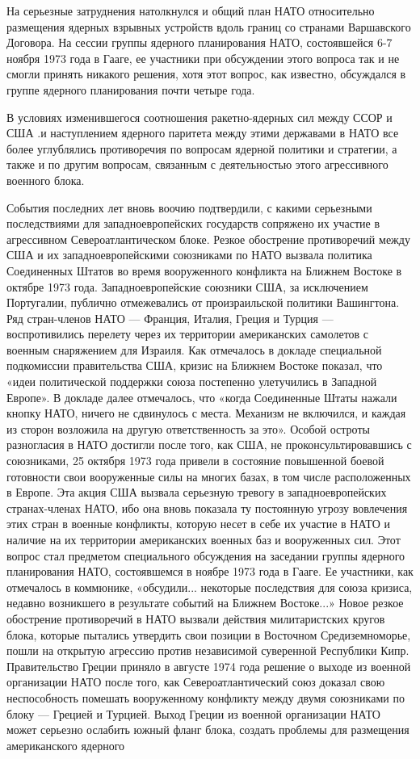 \documentclass[12pt, a4paper, openany]{book}
\begin{document}
	На серьезные затруднения натолкнулся и общий план НАТО относительно размещения ядерных взрывных устройств вдоль границ со странами Варшавского Договора. На сессии группы ядерного планирования НАТО, состоявшейся 6-7 ноября 1973 года в Гааге, ее участники при обсуждении этого вопроса так и не смогли принять никакого решения, хотя этот вопрос, как известно, обсуждался в группе ядерного планирования почти четыре года.
	
	В условиях изменившегося соотношения ракетно-ядерных сил между ССОР и США .и наступлением ядерного паритета между этими державами в НАТО все более углублялись противоречия по вопросам ядерной политики и стратегии, а также и по другим вопросам, связанным с деятельностью этого агрессивного военного блока.
	
	События последних лет вновь воочию подтвердили, с какими серьезными последствиями для западноевропейских государств сопряжено их участие в агрессивном Североатлантическом блоке. Резкое обострение противоречий между США и их западноевропейскими союзниками по НАТО вызвала политика Соединенных Штатов во время вооруженного конфликта на Ближнем Востоке в октябре 1973 года. Западноевропейские союзники США, за исключением Португалии, публично отмежевались от произраильской политики Вашингтона. Ряд стран-членов НАТО — Франция, Италия, Греция и Турция — воспротивились перелету через их территории американских самолетов с военным снаряжением для Израиля. Как отмечалось в докладе специальной подкомиссии правительства США, кризис на Ближнем Востоке показал, что «идеи политической поддержки союза постепенно улетучились в Западной Европе». В докладе далее отмечалось, что «когда Соединенные Штаты нажали кнопку НАТО, ничего не сдвинулось с места. Механизм не включился, и каждая из сторон возложила на другую ответственность за это». Особой остроты разногласия в НАТО достигли после того, как США, не проконсультировавшись с союзниками, 25 октября 1973 года привели в состояние повышенной боевой готовности свои вооруженные силы на многих базах, в том числе расположенных в Европе. Эта акция США вызвала серьезную тревогу в западноевропейских странах-членах НАТО, ибо она вновь показала ту постоянную угрозу вовлечения этих стран в военные конфликты, которую несет в себе их участие в НАТО и наличие на их территории американских военных баз и вооруженных сил. Этот вопрос стал предметом специального обсуждения на заседании группы ядерного планирования НАТО, состоявшемся в ноябре 1973 года в Гааге. Ее участники, как отмечалось в коммюнике, «обсудили... некоторые последствия для союза кризиса, недавно возникшего в результате событий на Ближнем Востоке...» Новое резкое обострение противоречий в НАТО вызвали действия милитаристских кругов блока, которые пытались утвердить свои позиции в Восточном Средиземноморье, пошли на открытую агрессию против независимой суверенной Республики Кипр. Правительство Греции приняло в августе 1974 года решение о выходе из военной организации НАТО после того, как Североатлантический союз доказал свою неспособность помешать вооруженному конфликту между двумя союзниками по блоку — Грецией и Турцией. Выход Греции из военной организации НАТО может серьезно ослабить южный фланг блока, создать проблемы для размещения американского ядерного 
\end{document}
